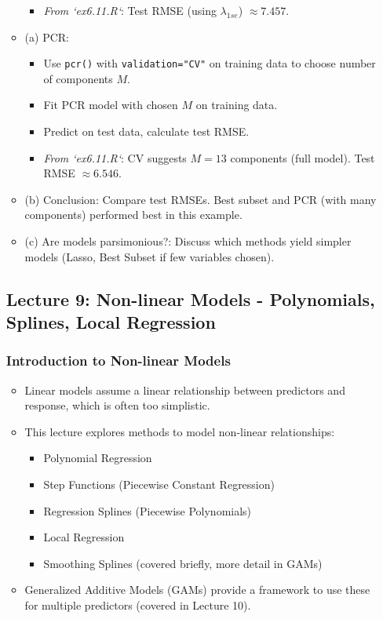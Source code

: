 \documentclass[12pt,a4paper]{article}
\newcommand{\Rfunction}[1]{\texttt{#1()}} %
\newcommand{\Rcode}[1]{\texttt{#1}} %
\begin{document}
\begin{itemize}
\begin{itemize}
\begin{itemize}
                    \item \textit{From `ex6.11.R`}: Test RMSE (using $\lambda_{1se}$) $\approx 7.457$.
                \end{itemize}
            \item (a) PCR:
                \begin{itemize}
                    \item Use \Rfunction{pcr} with \Rcode{validation="CV"} on training data to choose number of components $M$.
                    \item Fit PCR model with chosen $M$ on training data.
                    \item Predict on test data, calculate test RMSE.
                    \item \textit{From `ex6.11.R`}: CV suggests $M=13$ components (full model). Test RMSE $\approx 6.546$.
                \end{itemize}
            \item (b) Conclusion: Compare test RMSEs. Best subset and PCR (with many components) performed best in this example.
            \item (c) Are models parsimonious?: Discuss which methods yield simpler models (Lasso, Best Subset if few variables chosen).
        \end{itemize}
\subsection{Lecture 9: Non-linear Models - Polynomials, Splines, Local Regression }
    \subsubsection{Introduction to Non-linear Models }
        \begin{itemize}
            \item Linear models assume a linear relationship between predictors and response, which is often too simplistic.
            \item This lecture explores methods to model non-linear relationships:
                \begin{itemize}
                    \item Polynomial Regression
                    \item Step Functions (Piecewise Constant Regression)
                    \item Regression Splines (Piecewise Polynomials)
                    \item Local Regression
                    \item Smoothing Splines (covered briefly, more detail in GAMs)
                \end{itemize}
            \item Generalized Additive Models (GAMs) provide a framework to use these for multiple predictors (covered in Lecture 10).
        \end{itemize}


\end{itemize}
\end{document}
